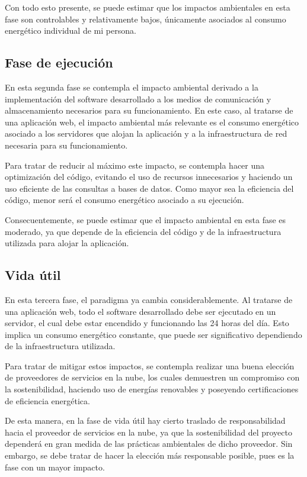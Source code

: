 Con todo esto presente, se puede estimar que los impactos ambientales en esta fase son controlables y relativamente bajos, únicamente asociados al consumo energético individual de mi persona.

\subsection{Fase de ejecución}

En esta segunda fase se contempla el impacto ambiental derivado a la implementación del software desarrollado a los medios de comunicación y almacenamiento necesarios para su funcionamiento. En este caso, al tratarse de una aplicación web, el impacto ambiental más relevante es el consumo energético asociado a los servidores que alojan la aplicación y a la infraestructura de red necesaria para su funcionamiento.

Para tratar de reducir al máximo este impacto, se contempla hacer una optimización del código, evitando el uso de recursos innecesarios y haciendo un uso eficiente de las consultas a bases de datos. Como mayor sea la eficiencia del código, menor será el consumo energético asociado a su ejecución.

Consecuentemente, se puede estimar que el impacto ambiental en esta fase es moderado, ya que depende de la eficiencia del código y de la infraestructura utilizada para alojar la aplicación.

\subsection{Vida útil}

En esta tercera fase, el paradigma ya cambia considerablemente. Al tratarse de una aplicación web, todo el software desarrollado debe ser ejecutado en un servidor, el cual debe estar encendido y funcionando las 24 horas del día. Esto implica un consumo energético constante, que puede ser significativo dependiendo de la infraestructura utilizada.

Para tratar de mitigar estos impactos, se contempla realizar una buena elección de proveedores de servicios en la nube, los cuales demuestren un compromiso con la sostenibilidad, haciendo uso de energías renovables y poseyendo certificaciones de eficiencia energética.

De esta manera, en la fase de vida útil hay cierto traslado de responsabilidad hacia el proveedor de servicios en la nube, ya que la sostenibilidad del proyecto dependerá en gran medida de las prácticas ambientales de dicho proveedor. Sin embargo, se debe tratar de hacer la elección más responsable posible, pues es la fase con un mayor impacto.

